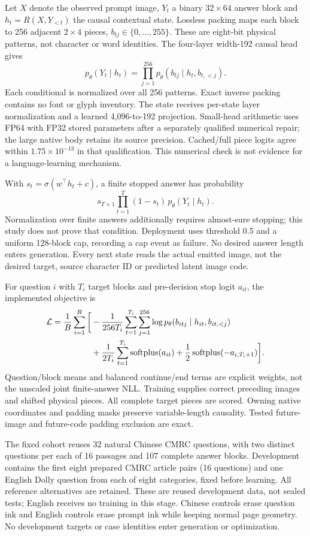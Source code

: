 \documentclass[10pt,a4paper]{article}
\begin{document}
Let $X$ denote the observed prompt image, $Y_t$ a binary $32\times64$ answer
block and $h_t=R(X,Y_{<t})$ the causal contextual state. Lossless packing
maps each block to 256 adjacent $2\times4$ pieces, $b_{tj}\in\{0,\ldots,255\}$.
These are eight-bit physical patterns, not character or word identities.
The four-layer width-192 causal head gives
\[
 p_\theta(Y_t\mid h_t)=\prod_{j=1}^{256}
 p_\theta(b_{tj}\mid h_t,b_{t,<j}).
\]
Each conditional is normalized over all 256 patterns. Exact inverse packing
contains no font or glyph inventory. The state receives per-state layer
normalization and a learned 4,096-to-192 projection. Small-head arithmetic
uses FP64 with FP32 stored parameters after a separately qualified numerical
repair; the large native body retains its source precision. Cached/full
piece logits agree within $1.75\times10^{-13}$ in that qualification. This
numerical check is not evidence for a language-learning mechanism.

With $s_t=\sigma(w^\top h_t+c)$, a finite stopped answer has probability
\[
 s_{T+1}\prod_{t=1}^{T}(1-s_t)\,p_\theta(Y_t\mid h_t).
\]
Normalization over finite answers additionally requires almost-sure stopping;
this study does not prove that condition. Deployment uses threshold 0.5 and
a uniform 128-block cap, recording a cap event as failure. No desired answer
length enters generation. Every next state reads the actual emitted image,
not the desired target, source character ID or predicted latent image code.

For question $i$ with $T_i$ target blocks and pre-decision stop logit $a_{it}$,
the implemented objective is
\[
\begin{split}
\mathcal L={1\over B}\sum_{i=1}^{B}\bigg[&
 -{1\over256T_i}\sum_{t=1}^{T_i}\sum_{j=1}^{256}
 \log p_\theta(b_{itj}\mid h_{it},b_{it,<j})\\
 &+{1\over2T_i}\sum_{t=1}^{T_i}\operatorname{softplus}(a_{it})
 +{1\over2}\operatorname{softplus}(-a_{i,T_i+1})\bigg].
\end{split}
\]
Question/block means and balanced continue/end terms are explicit weights,
not the unscaled joint finite-answer NLL. Training supplies correct preceding
images and shifted physical pieces. All complete target pieces are scored.
Owning native coordinates and padding masks preserve variable-length
causality. Tested future-image and future-code padding exclusion are exact.

The fixed cohort reuses 32 natural Chinese CMRC questions, with two distinct
questions per each of 16 passages and 107 complete answer blocks. Development
contains the first eight prepared CMRC article pairs (16 questions) and one
English Dolly question from each of eight categories, fixed before learning.
All reference alternatives are retained. These are reused development data,
not sealed tests; English receives no training in this stage. Chinese controls
erase question ink and English controls erase prompt ink while keeping normal
page geometry. No development targets or case identities enter generation or
optimization.
\end{document}
